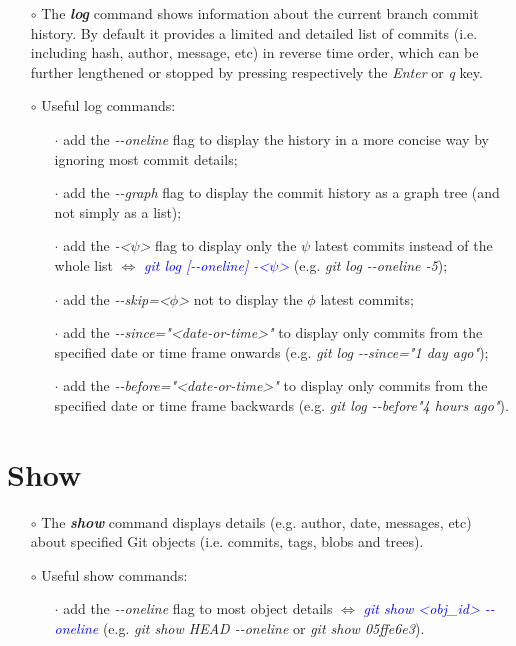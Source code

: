 \documentclass[a4paper,portrait,10pt]{article}   %
\newcommand{\mybulletlvA}{$\circ$}   %
\newcommand{\mybulletlvB}{$\cdot$}   %
\newcommand{\mydiv}{$\Leftrightarrow$ }   %
\newcommand{\mycmd}[1]{\textcolor{blue}{\textit{#1}}}   %
\newcommand{\myvspace}{\vspace{4mm}}   %
\begin{document}
\begin{itemize}
\item[\mybulletlvA] The \textbf{\textit{log}} command shows information about the current branch commit history. By default it provides a limited and detailed list of commits (i.e. including hash, author, message, etc) in reverse time order, which can be further lengthened or stopped by pressing respectively the \textit{Enter} or \textit{q} key.
\myvspace

\item[\mybulletlvA] Useful log commands:
\begin{itemize}
  \item[\mybulletlvB] add the \textit{-{}-oneline} flag to display the history in a more concise way by ignoring most commit details;
  \item[\mybulletlvB] add the \textit{-{}-graph} flag to display the commit history as a graph tree (and not simply as a list);
  \item[\mybulletlvB] add the \textit{-<$\psi$>} flag to display only the $\psi$ latest commits instead of the whole list \mydiv \mycmd{git log [-{}-oneline] -<$\psi$>} (e.g. \textit{git log -{}-oneline -5});
  \item[\mybulletlvB] add the \textit{-{}-skip=<$\phi$>} not to display the $\phi$ latest commits;
  \item[\mybulletlvB] add the \textit{-{}-since="<date-or-time>"} to display only commits from the specified date or time frame onwards (e.g. \textit{git log -{}-since="1 day ago"});
  \item[\mybulletlvB] add the \textit{-{}-before="<date-or-time>"} to display only commits from the specified date or time frame backwards (e.g. \textit{git log -{}-before"4 hours ago"}).
\end{itemize}
\end{itemize}
\myvspace


\section{Show}   \label{sec:Show}

\begin{itemize}
\item[\mybulletlvA] The \textbf{\textit{show}} command displays details (e.g. author, date, messages, etc) about specified Git objects (i.e. commits, tags, blobs and trees).
\myvspace

\item[\mybulletlvA] Useful show commands:
\begin{itemize}
  \item[\mybulletlvB] add the \textit{-{}-oneline} flag to most object details \mydiv \mycmd{git show <obj\_id> -{}-oneline} (e.g. \textit{git show HEAD -{}-oneline} or \textit{git show 05ffe6e3}).
\end{itemize}
\end{itemize}
\myvspace
\end{document}
